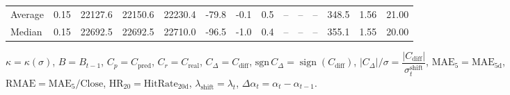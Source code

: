 \begin{threeparttable}
{\begin{tabular}{lrrrrrrrrrrrrr}
Average &     0.15 & 22127.6 & 22150.6 & 22230.4 &      -79.8 &                     -0.1 &                 0.5 &         -- &        -- &             -- &            348.5 &            1.56 &                  21.00 \\
 Median &     0.15 & 22692.5 & 22692.5 & 22710.0 &      -96.5 &                     -1.0 &                 0.4 &         -- &        -- &             -- &            355.1 &            1.55 &                  20.00 \\
\bottomrule
\end{tabular}
}
\begin{tablenotes}\footnotesize
\item $\kappa=\kappa(\sigma)$, $B=B_{t-1}$, $C_p=C_{\text{pred}}$, $C_r=C_{\text{real}}$, $C_\Delta=C_{\text{diff}}$, $\mathrm{sgn}\,C_\Delta=\operatorname{sign}(C_{\text{diff}})$, $|C_\Delta|/\sigma=\dfrac{|C_{\text{diff}}|}{\sigma_t^{\text{shift}}}$, $\mathrm{MAE}_5=\mathrm{MAE}_{5\text{d}}$, $\mathrm{RMAE}= \mathrm{MAE}_5 / \text{Close}$, $\mathrm{HR}_{20}=\mathrm{HitRate}_{20\text{d}}$, 
$\lambda_{\text{shift}}=\lambda_t$, 
$\Delta\alpha_t=\alpha_t-\alpha_{t-1}$.
\end{tablenotes}
\end{threeparttable}
\endgroup

